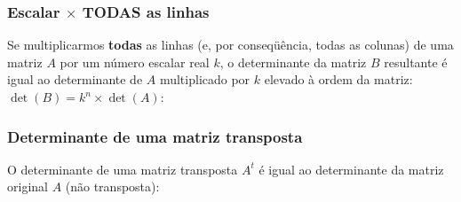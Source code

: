 \documentclass[pdftex, brazil, aspectratio=169]{beamer}
\begin{document}
\begin{frame}[t]
  \frametitle{Escalar $\times$ TODAS as linhas}
  Se multiplicarmos \textbf{todas} as linhas (e, por conseqüência, todas as
  colunas) de uma matriz $A$ por um número escalar real $k$, o determinante da
  matriz $B$ resultante é igual ao determinante de $A$ multiplicado por $k$ elevado
  à ordem da matriz: $\det(B) = k^n \times \det(A)$:

\end{frame}

\begin{frame}[t]
  \frametitle{Determinante de uma matriz transposta}
  O determinante de uma matriz transposta $A^t$ é igual ao determinante da
  matriz original $A$ (não transposta):

\end{frame}
\end{document}
